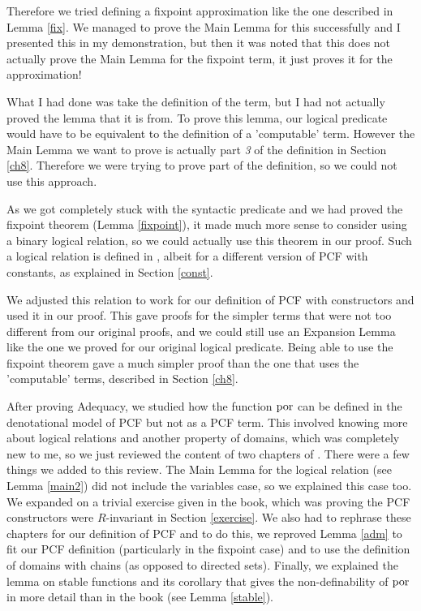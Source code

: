 Therefore we tried defining a fixpoint approximation like the one described in Lemma \ref{fix}. We managed to prove the Main Lemma for this successfully and I presented this in my demonstration, but then it was noted that this does not actually prove the Main Lemma for the fixpoint term, it just proves it for the approximation! 

What I had done was take the definition of the term, but I had not actually proved the lemma that it is from. To prove this lemma, our logical predicate would have to be equivalent to the definition of a 'computable' term. However the Main Lemma we want to prove is actually part \emph{3} of the definition in Section \ref{ch8}. Therefore we were trying to prove part of the definition, so we could not use this approach. 

As we got completely stuck with the syntactic predicate and we had proved the fixpoint theorem (Lemma \ref{fixpoint}), it made much more sense to consider using a binary logical relation, so we could actually use this theorem in our proof. Such a logical relation is defined in \citep{Streicher06} , albeit for a different version of PCF with constants, as explained in Section \ref{const}. 

We adjusted this relation to work for our definition of PCF with constructors and used it in our proof. This gave proofs for the simpler terms that were not too different from our  original proofs, and we could still use an Expansion Lemma like the one we proved for our original logical predicate. Being able to use the fixpoint theorem gave a much simpler proof than the one that uses the 'computable' terms, described in Section \ref{ch8}. 

After proving Adequacy, we studied how the function $\operatorname{por}$ can be defined in the denotational model of PCF but not as a PCF term. This involved knowing more about logical relations and another property of domains, which was completely new to me, so we just reviewed the content of two chapters of \citep{Streicher06}. There were a few things we added to this review. The Main Lemma for the logical relation (see Lemma \ref{main2}) did not include the variables case, so we explained this case too. We expanded on a trivial exercise given in the book, which was proving the PCF constructors were $R$-invariant in Section \ref{exercise}. We also had to rephrase these chapters for our definition of PCF and to do this, we reproved Lemma \ref{adm} to fit our PCF definition (particularly in the fixpoint case) and to use the definition of domains with chains (as opposed to directed sets). Finally, we explained the lemma on stable functions and its corollary that gives the non-definability of $\operatorname{por}$ in more detail than in the book (see Lemma \ref{stable}).

